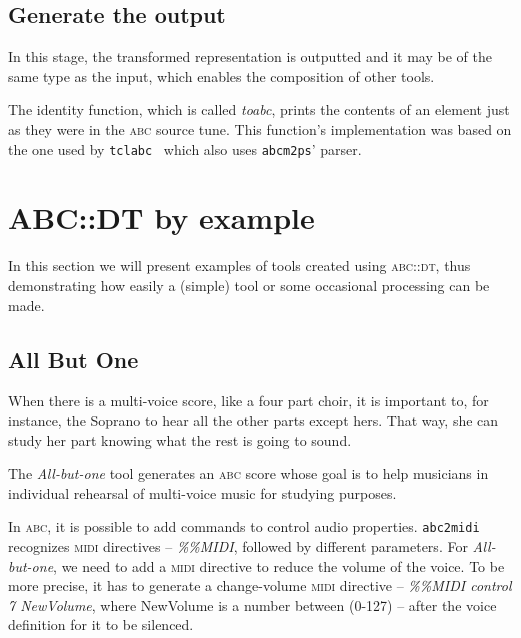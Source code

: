 \documentclass[a4paper,UKenglish]{oasics}
\newcommand{\abc}{\textsc{abc}}
\newcommand{\abcdt}{\textsc{abc::dt}}
\newcommand{\midi}{\textsc{midi} }
\newcommand{\toabc}{\emph{toabc}}
\newcommand{\abcmtops}{\texttt{abcm2ps}}
\newcommand{\abctomidi}{\texttt{abc2midi}}
\begin{document}
\subsection{Generate the output}

    In this stage, the transformed representation is outputted and it may be of the same type as the
    input, which enables the composition of other tools.

    The identity function, which is called \toabc, prints the contents of an element just as they
    were in the \abc{} source tune. This function's implementation was based on the one used by
    \texttt{tclabc}~\cite{tclabc:Online} which also uses \abcmtops' parser.

\section{ABC::DT by example}
\label{sec:abc_dt_by_example}

In this section we will present examples of tools created using \abcdt{},
thus demonstrating how easily a (simple) tool or some occasional processing can be made. 

\subsection{All But One}

    When there is a multi-voice score, like a four part choir, it is important to, for instance, the
    Soprano to hear all the other parts except hers.  That way, she can study her part knowing what
    the rest is going to sound.

    The \emph{All-but-one} tool generates an \abc{} score whose goal is to help musicians in
    individual rehearsal of multi-voice music for studying purposes. 

    In \abc{}, it is possible to add commands to control audio properties. \abctomidi{} recognizes
    \midi directives -- \emph{\%\%MIDI}, followed by different parameters. For \emph{All-but-one},
    we need to add a \midi directive to reduce the volume of the voice. To be more precise, it has
    to generate a change-volume \midi directive -- \emph{\%\%MIDI control 7 NewVolume}, where
    NewVolume is a number between (0-127) -- after the voice definition for it to be silenced.\\

\end{document}
